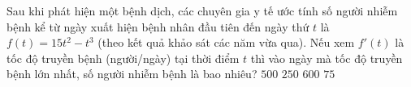 \begin{vd}%
    Sau khi phát hiện một bệnh dịch, các chuyên gia y tế ước tính số người nhiễm bệnh kể từ ngày xuất hiện bệnh nhân đầu tiên đến ngày thứ $t$ là  $f(t) =15t^2 -t^3$ (theo kết quả khảo sát các năm vừa qua). Nếu xem $f'(t)$ là tốc độ truyền bệnh (người/ngày) tại thời điểm $t$ thì vào ngày mà tốc độ truyền bệnh lớn nhất, số người nhiễm bệnh là bao nhiêu?
    \choice
    {$500$}
    {\True $250$}
    {$600$}
    {$75$}
\end{vd}
